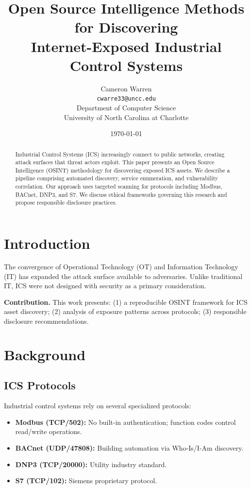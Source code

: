\documentclass[11pt,a4paper]{article}
\title{Open Source Intelligence Methods for Discovering\\
       Internet-Exposed Industrial Control Systems}
\author{
  Cameron Warren\\
  \texttt{cwarre33@uncc.edu}\\[0.5em]
  Department of Computer Science\\
  University of North Carolina at Charlotte
}
\date{\today}
\begin{document}
\maketitle

\begin{abstract}
Industrial Control Systems (ICS) increasingly connect to public networks, 
creating attack surfaces that threat actors exploit. This paper presents an 
Open Source Intelligence (OSINT) methodology for discovering exposed ICS assets. 
We describe a pipeline comprising automated discovery, service enumeration, and 
vulnerability correlation. Our approach uses targeted scanning for protocols 
including Modbus, BACnet, DNP3, and S7. We discuss ethical frameworks governing 
this research and propose responsible disclosure practices.
\end{abstract}

\section{Introduction}

The convergence of Operational Technology (OT) and Information Technology (IT) 
has expanded the attack surface available to adversaries. Unlike traditional IT, 
ICS were not designed with security as a primary consideration.

\textbf{Contribution.} This work presents: (1) a reproducible OSINT framework 
for ICS asset discovery; (2) analysis of exposure patterns across protocols; 
(3) responsible disclosure recommendations.

\section{Background}

\subsection{ICS Protocols}

Industrial control systems rely on several specialized protocols:

\begin{itemize}
  \item \textbf{Modbus (TCP/502):} No built-in authentication; function codes 
    control read/write operations.
  \item \textbf{BACnet (UDP/47808):} Building automation via Who-Is/I-Am discovery.
  \item \textbf{DNP3 (TCP/20000):} Utility industry standard.
  \item \textbf{S7 (TCP/102):} Siemens proprietary protocol.
\end{itemize}
\end{document}
